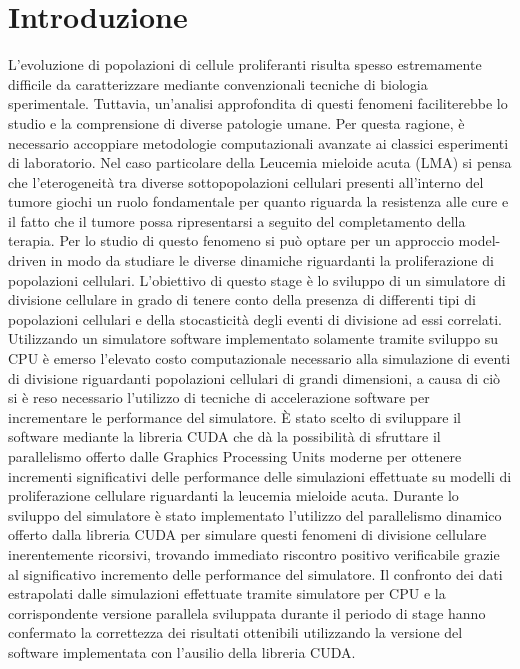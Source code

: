 
\chapter{Introduzione} %

\label{Introduzione} %



L’evoluzione di popolazioni di cellule proliferanti risulta spesso estremamente
difficile da caratterizzare mediante convenzionali tecniche di biologia
sperimentale. Tuttavia, un’analisi approfondita di questi fenomeni
faciliterebbe lo studio e la comprensione di diverse patologie umane.
Per questa ragione, è necessario accoppiare metodologie computazionali 
avanzate ai classici esperimenti di laboratorio. Nel caso particolare della 
Leucemia mieloide acuta (LMA) si pensa che l'eterogeneità tra diverse 
sottopopolazioni cellulari presenti all'interno del tumore giochi un ruolo 
fondamentale per quanto riguarda la resistenza alle cure e il fatto che il 
tumore possa ripresentarsi a seguito del completamento della terapia.
Per lo studio di questo fenomeno si può optare per un approccio model-driven 
in modo da studiare le diverse dinamiche riguardanti la proliferazione di 
popolazioni cellulari. L'obiettivo di questo stage è lo sviluppo di un 
simulatore di divisione cellulare in grado di tenere conto della presenza 
di differenti tipi di popolazioni cellulari e della stocasticità degli eventi
di divisione ad essi correlati. Utilizzando un simulatore software implementato 
solamente tramite sviluppo su CPU è emerso l'elevato costo 
computazionale necessario alla simulazione di eventi di divisione riguardanti 
popolazioni cellulari di grandi dimensioni, a causa di ciò si è reso necessario 
l'utilizzo di tecniche di accelerazione software per incrementare le 
performance del simulatore. È stato scelto di sviluppare il software 
mediante la libreria CUDA che dà la possibilità di sfruttare il parallelismo 
offerto dalle Graphics Processing Units moderne per ottenere incrementi 
significativi delle performance delle simulazioni effettuate su modelli di 
proliferazione cellulare riguardanti la leucemia mieloide acuta.
Durante lo sviluppo del simulatore è stato implementato l'utilizzo del 
parallelismo dinamico offerto dalla libreria CUDA per simulare questi fenomeni 
di divisione cellulare inerentemente ricorsivi, trovando immediato riscontro 
positivo verificabile grazie al significativo incremento delle performance 
del simulatore. Il confronto dei dati estrapolati dalle simulazioni effettuate
tramite simulatore per CPU e la corrispondente versione parallela 
sviluppata durante il periodo di stage hanno confermato la correttezza dei 
risultati ottenibili utilizzando la versione del software implementata con
l'ausilio della libreria CUDA.
